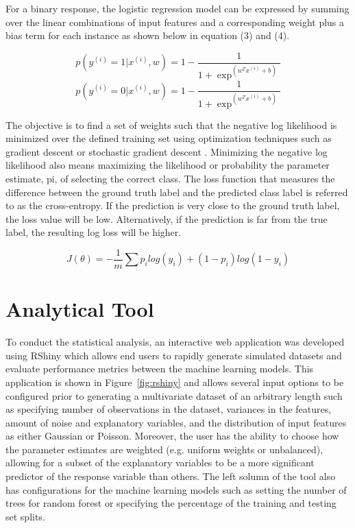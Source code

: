 \documentclass{llncs}
\begin{document}
\noindent 
For a binary response, the logistic regression model can be expressed by summing over the linear combinations of input features and a corresponding weight plus a bias term for each instance as shown below in equation (3) and (4).

\begin{equation}
p(y^{(i)} = 1 | x^{(i)},w) = 1-  \frac{1}{1+\exp^{(w^{T}x^{(i)}+b)}}
\end{equation}
\begin{equation}
p(y^{(i)} = 0 | x^{(i)},w) = 1-  \frac{1}{1+\exp^{(w^{T}x^{(i)}+b)}}
\end{equation}


\noindent 
The objective is to find a set of weights such that the negative log likelihood is minimized over the defined training set using optimization techniques such as gradient descent or stochastic gradient descent \cite{ng}. Minimizing the negative log likelihood also means maximizing the likelihood or probability the parameter estimate, pi, of selecting the correct class. The loss function that measures the difference between the ground truth label and the predicted class label is referred to as the cross-entropy. If the prediction is very close to the ground truth label, the loss value will be low. Alternatively, if the prediction is far from the true label, the resulting log loss will be higher.

\begin{equation}
J(\theta) = -\frac{1}{m}\sum p_{i}log(y_{i}) + (1-p_{i})log(1-y_{i})
\end{equation}

 
\section{Analytical Tool}

\noindent 
To conduct the statistical analysis, an interactive web application was developed using RShiny which allows end users to rapidly generate simulated datasets and evaluate performance metrics between the machine learning models. This application is shown in Figure~\ref{fig:rshiny} and allows several input options to be configured prior to generating a multivariate dataset of an arbitrary length such as specifying number of observations in the dataset, variances in the features, amount of noise and explanatory variables, and the distribution of input features as either Gaussian or Poisson. Moreover, the user has the ability to choose how the parameter estimates are weighted (e.g. uniform weights or unbalanced), allowing for a subset of the explanatory variables to be a more significant predictor of the response variable than others. The left solumn of the tool also has configurations for the machine learning models such as setting the number of trees for random forest or specifying the percentage of the training and testing set splits.
\end{document}
